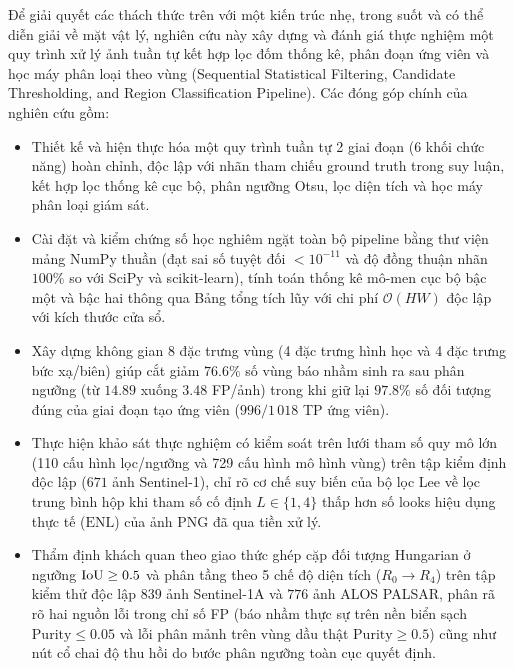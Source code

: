Để giải quyết các thách thức trên với một kiến trúc nhẹ, trong suốt và có thể diễn giải về mặt vật lý, nghiên cứu này xây dựng và đánh giá thực nghiệm một quy trình xử lý ảnh tuần tự kết hợp lọc đốm thống kê, phân đoạn ứng viên và học máy phân loại theo vùng (Sequential Statistical Filtering, Candidate Thresholding, and Region Classification Pipeline). Các đóng góp chính của nghiên cứu gồm:
\begin{itemize}
    \item Thiết kế và hiện thực hóa một quy trình tuần tự 2 giai đoạn (6 khối chức năng) hoàn chỉnh, độc lập với nhãn tham chiếu ground truth trong suy luận, kết hợp lọc thống kê cục bộ, phân ngưỡng Otsu, lọc diện tích và học máy phân loại giám sát.
    \item Cài đặt và kiểm chứng số học nghiêm ngặt toàn bộ pipeline bằng thư viện mảng NumPy thuần (đạt sai số tuyệt đối $< 10^{-11}$ và độ đồng thuận nhãn $100\%$ so với SciPy và scikit-learn), tính toán thống kê mô-men cục bộ bậc một và bậc hai thông qua Bảng tổng tích lũy với chi phí $\mathcal{O}(HW)$ độc lập với kích thước cửa sổ.
    \item Xây dựng không gian 8 đặc trưng vùng (4 đặc trưng hình học và 4 đặc trưng bức xạ/biên) giúp cắt giảm $76.6\%$ số vùng báo nhầm sinh ra sau phân ngưỡng (từ $14.89$ xuống $3.48$ FP/ảnh) trong khi giữ lại $97.8\%$ số đối tượng đúng của giai đoạn tạo ứng viên ($996/1\,018$ TP ứng viên).
    \item Thực hiện khảo sát thực nghiệm có kiểm soát trên lưới tham số quy mô lớn (110 cấu hình lọc/ngưỡng và 729 cấu hình mô hình vùng) trên tập kiểm định độc lập ($671$ ảnh Sentinel-1), chỉ rõ cơ chế suy biến của bộ lọc Lee về lọc trung bình hộp khi tham số cố định $L \in \{1, 4\}$ thấp hơn số looks hiệu dụng thực tế ($\text{ENL}$) của ảnh PNG đã qua tiền xử lý.
    \item Thẩm định khách quan theo giao thức ghép cặp đối tượng Hungarian ở ngưỡng $\mathrm{IoU} \ge 0.5$ và phân tầng theo 5 chế độ diện tích ($R_0 \to R_4$) trên tập kiểm thử độc lập $839$ ảnh Sentinel-1A và $776$ ảnh ALOS PALSAR, phân rã rõ hai nguồn lỗi trong chỉ số FP (báo nhầm thực sự trên nền biển sạch $\mathrm{Purity} \le 0.05$ và lỗi phân mảnh trên vùng dầu thật $\mathrm{Purity} \ge 0.5$) cũng như nút cổ chai độ thu hồi do bước phân ngưỡng toàn cục quyết định.
\end{itemize}
